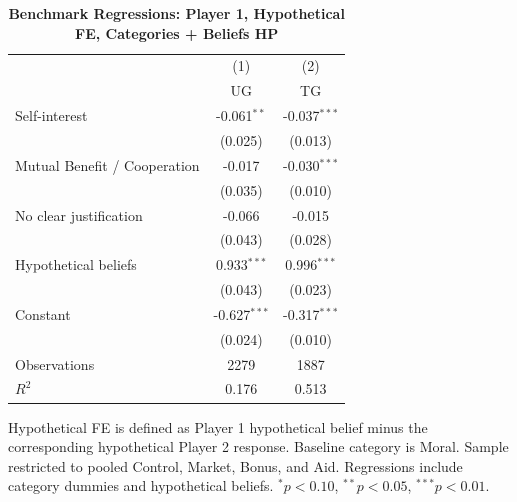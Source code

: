 \begin{table}[!htbp]
\centering
\caption{\textbf{Benchmark Regressions: Player 1, Hypothetical FE, Categories + Beliefs HP}}
\label{tab:cats_hp_cats_hp_hypfe_regs}
\begin{tabular}{lcc}
\toprule
 & (1) & (2) \\
 & UG & TG \\
\midrule
Self-interest & -0.061$^{**}$ & -0.037$^{***}$ \\
 & (0.025) & (0.013) \\
Mutual Benefit / Cooperation & -0.017 & -0.030$^{***}$ \\
 & (0.035) & (0.010) \\
No clear justification & -0.066 & -0.015 \\
 & (0.043) & (0.028) \\
Hypothetical beliefs & 0.933$^{***}$ & 0.996$^{***}$ \\
 & (0.043) & (0.023) \\
Constant & -0.627$^{***}$ & -0.317$^{***}$ \\
 & (0.024) & (0.010) \\
\midrule
Observations & 2279 & 1887 \\
$R^2$ & 0.176 & 0.513 \\
\bottomrule
\end{tabular}
\begin{flushleft}
\footnotesize Hypothetical FE is defined as Player 1 hypothetical belief minus the corresponding hypothetical Player 2 response. Baseline category is Moral. Sample restricted to pooled Control, Market, Bonus, and Aid. Regressions include category dummies and hypothetical beliefs. $^{*}p<0.10$, $^{**}p<0.05$, $^{***}p<0.01$.
\end{flushleft}
\end{table}
